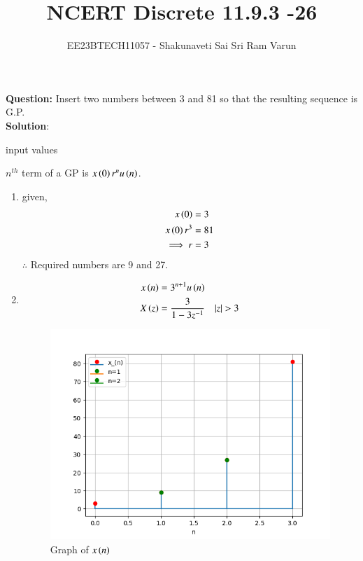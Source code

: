 \documentclass[journal,12pt,twocolumn]{IEEEtran}
\theoremstyle{remark}
\begin{document}

\vspace{3cm}

\title{NCERT Discrete 11.9.3 -26}
\author{EE23BTECH11057 - Shakunaveti Sai Sri Ram Varun$^{}$%
}
\maketitle
\newpage
\bigskip
\vspace{2cm}
\textbf{Question: }
Insert two numbers between 3 and 81 so that the resulting sequence is G.P.\\
\textbf{Solution}:\\
\begin{table}[htbp] 
\centering

\caption{input values}
\label{tab: Table 11.9.3.26.15}
\end{table}
$ n^{th}$ term of a GP is $ x\left(0\right)r^{n}u\left(n\right)$.
\begin{enumerate}
\item 
given,
\begin{align}
x\left(0\right) &= 3\\
x\left(0\right)r^3 &=81\\
\implies r&=3
\end{align}
$ \therefore $ Required numbers are 9 and 27.
\item 
\begin{align}
x\brak{n} &= 3^{n+1}u\brak{n} \label{eq:11.9.3.26.1}\\
X\brak{z} &= \frac{3}{1-3z^{-1}} \quad |z|>3 \label{eq:11.9.3.26.2}
\end{align}
\begin{figure}[h!]
    \includegraphics[width = \columnwidth]{figs/Figure_1.png}
    \caption{Graph of $ x\left(n\right)$ }
    \label{fig: 11.9.3.26.17}
\end{figure}
\end{enumerate}
\end{document}
